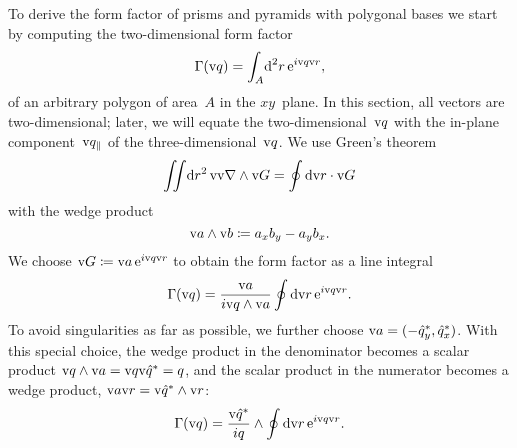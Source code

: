 To derive the form factor of prisms and pyramids with polygonal bases
we start by computing the two-dimensional form factor
\begin{equation}\label{Eff2d}
  \Gamma(\text{v}{q})=\int_A\!\text{d}^2r\, \text{e}^{i\text{v}{q}\text{v}{r}},
\end{equation}
of an arbitrary polygon of area~$A$ in the $xy$~plane.
In this section, all vectors are two-dimensional;
later, we will equate the two-dimensional~$\text{v}{q}$ with the in-plane
component~$\text{v}{q}_\parallel$ of the three-dimensional~$\text{v}{q}$.
We use Green's theorem
\begin{equation}
  \iint\!\text{d} r^2\,\text{v}{\text{v}{\nabla}}\wedge\text{v}{G} = \oint \text{d}\text{v}{r}\cdot\text{v}{G}
\end{equation}
with the wedge product
\begin{equation}
  \text{v}{a}\wedge\text{v}{b} \coloneqq
  a_xb_y - a_yb_x.
\end{equation}
We choose $\text{v}{G}\coloneqq\text{v}{a}\, \text{e}^{i\text{v}{q}\text{v}{r}}$
to obtain the form factor as a line integral
\begin{equation}
  \Gamma(\text{v}{q})=\frac{\text{v}{a}}{i \text{v}{q}\wedge\text{v}{a}} \oint \text{d}\text{v}{r}\,\text{e}^{i\text{v}{q}\text{v}{r}}.
\end{equation}
To avoid singularities as far as possible,
we further choose $\text{v}{a}=(-\hat q_y^*,\hat q_x^*)$.
With this special choice,
the wedge product in the denominator becomes a scalar product
$\text{v}{q}\wedge\text{v}{a}=\text{v}{q}\text{v}{\hat q^*}=q$, and
the scalar product in the numerator becomes a wedge product,
$\text{v}{a}\text{v}{r}=\text{v}{\hat q^*}\wedge\text{v}{r}$:
\begin{equation}
  \Gamma(\text{v}{q})=\frac{\text{v}{\hat q^*}}{iq}\wedge \oint \text{d}\text{v}{r}\,\text{e}^{i\text{v}{q}\text{v}{r}}.
\end{equation}

